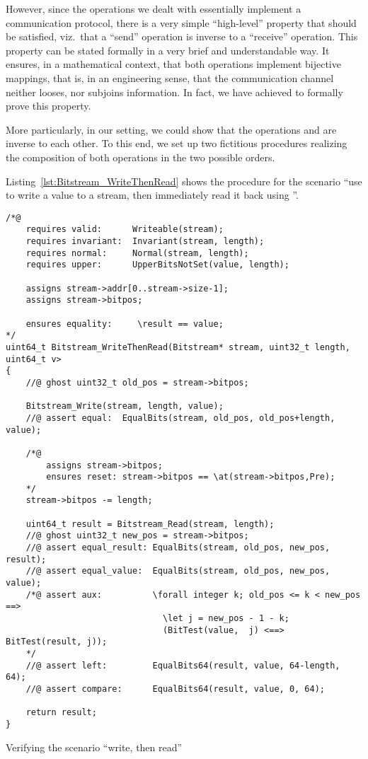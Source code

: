 However, since the operations we dealt with essentially implement a
communication protocol, there is a very simple ``high-level'' property
that should be satisfied, viz.\ that a ``send'' operation is inverse
to a ``receive'' operation.
%
This property can be stated formally in a very brief and understandable
way.
%
It ensures, in a mathematical context, that both operations implement
bijective mappings, that is, in an engineering sense, that the
communication channel neither looses, nor subjoins information.
%
In fact, we have achieved to formally prove this property.




More particularly, in our setting, we could show that the operations
 and  are
inverse to each other.
%
To this end, we set up two fictitious  procedures realizing
the composition of both operations in the two possible orders.




Listing~\ref{lst:Bitstream_WriteThenRead}
shows the procedure for the scenario ``use 
to write a value to a stream, then immediately read it back using
''.


\begin{listing}[hbt]
\begin{minipage}{0.99\textwidth}
\begin{lstlisting}[style=acsl-block]
/*@
    requires valid:      Writeable(stream);
    requires invariant:  Invariant(stream, length);
    requires normal:     Normal(stream, length);
    requires upper:      UpperBitsNotSet(value, length);

    assigns stream->addr[0..stream->size-1];
    assigns stream->bitpos;

    ensures equality:     \result == value;
*/
uint64_t Bitstream_WriteThenRead(Bitstream* stream, uint32_t length, uint64_t v>
{
    //@ ghost uint32_t old_pos = stream->bitpos;

    Bitstream_Write(stream, length, value);
    //@ assert equal:  EqualBits(stream, old_pos, old_pos+length, value);

    /*@ 
        assigns stream->bitpos;
        ensures reset: stream->bitpos == \at(stream->bitpos,Pre);
    */
    stream->bitpos -= length;

    uint64_t result = Bitstream_Read(stream, length);
    //@ ghost uint32_t new_pos = stream->bitpos;
    //@ assert equal_result: EqualBits(stream, old_pos, new_pos, result);
    //@ assert equal_value:  EqualBits(stream, old_pos, new_pos, value);
    /*@ assert aux:          \forall integer k; old_pos <= k < new_pos ==>
                               \let j = new_pos - 1 - k;
                               (BitTest(value,  j) <==> BitTest(result, j));
    */
    //@ assert left:         EqualBits64(result, value, 64-length, 64);
    //@ assert compare:      EqualBits64(result, value, 0, 64);

    return result;
}
\end{lstlisting}
\end{minipage}
\caption{\label{lst:Bitstream_WriteThenRead}
	Verifying the scenario ``write, then read'' }
\end{listing}

